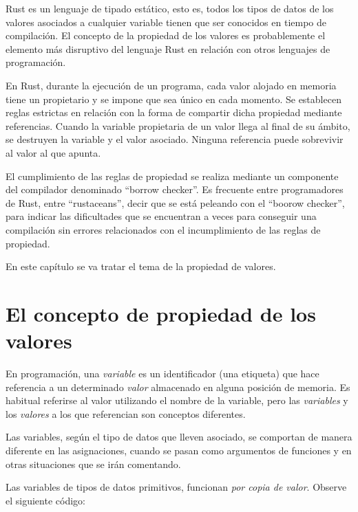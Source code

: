 \begin{Resumen}
Rust es un lenguaje de tipado estático, esto es, todos los tipos de datos de los valores asociados a cualquier variable  tienen que ser conocidos en tiempo de compilación. El concepto de la propiedad de los valores es probablemente el elemento más disruptivo del lenguaje Rust en relación con otros lenguajes de programación.

\smallskip

En Rust, durante la ejecución de un programa, cada valor alojado en memoria tiene un propietario y se impone que sea único en cada momento. Se establecen reglas estrictas en relación con la forma de compartir dicha propiedad mediante referencias. Cuando la variable propietaria de un valor llega al final de su ámbito, se destruyen la variable y el valor asociado. Ninguna referencia puede sobrevivir al valor al que apunta.

\smallskip

El cumplimiento de las reglas de propiedad se realiza mediante un componente del compilador denominado ``borrow checker''. Es frecuente entre programadores de Rust, entre ``rustaceans'', decir que se está peleando con el ``boorow checker'', para indicar las dificultades que se encuentran a veces para conseguir una compilación sin errores relacionados con el incumplimiento de las reglas de propiedad.

\smallskip

En este capítulo se va tratar el tema de la propiedad de valores. 

\end{Resumen}


\section{El concepto de propiedad de los valores}
\label{sec_propiedad}

En programación, una \textit{variable} es un identificador (una etiqueta) que hace referencia a un determinado \textit{valor} almacenado en alguna posición de memoria. Es habitual referirse al valor utilizando el nombre de la variable, pero las \textit{variables} y los \textit{valores} a los que referencian son conceptos diferentes.

Las variables, según el tipo de datos que lleven asociado, se comportan de manera diferente en las asignaciones, cuando se pasan como argumentos de funciones y en otras situaciones que se irán comentando.

Las variables de tipos de datos primitivos, funcionan \textit{por copia de valor}. Observe el siguiente código:


